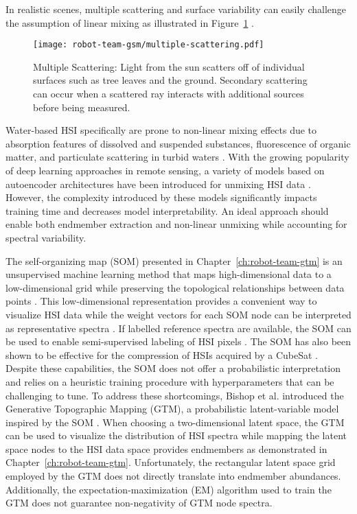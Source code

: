 In realistic scenes, multiple scattering and surface variability can easily
challenge the assumption of linear mixing as illustrated in
Figure~\ref{fig:multiple-scattering} \cite{heylen2014review}.
\begin{figure}[H]
  \centering
  \texttt{[image: robot-team-gsm/multiple-scattering.pdf]}
  \caption{Multiple Scattering: Light from the sun scatters off of individual
    surfaces such as tree leaves and the ground. Secondary
    scattering can occur when a scattered ray interacts with additional sources
    before being measured.}
  \label{fig:multiple-scattering}
\end{figure}
Water-based HSI specifically are prone to non-linear mixing effects due to absorption
features of dissolved and suspended substances, fluorescence of organic matter,
and particulate scattering in turbid waters \cite{hsi-absorption,
  hsi-fluorescence, hsi-turibidity}. With the growing popularity of deep
learning approaches in remote sensing, a variety of models based on autoencoder
architectures have been introduced for unmixing HSI data
\cite{non-negative-autoencoders,su2019daen,borsoi2019deep,palsson2020convolutional}.
However, the complexity introduced by these models significantly impacts
training time and decreases model interpretability. An ideal approach
should enable both endmember extraction and non-linear unmixing while accounting
for spectral variability.

The self-organizing map (SOM) presented in Chapter~\ref{ch:robot-team-gtm} is an
unsupervised machine learning method that
maps high-dimensional data to a low-dimensional grid while preserving the
topological relationships between data points \cite{kohonen-som-1}. This
low-dimensional representation provides a convenient way to visualize HSI data
while the weight vectors for each SOM node can be interpreted as representative
spectra \cite{cantero2004analysis, duran2007time,som-hsi}. If labelled reference
spectra are available, the SOM can be used to enable semi-supervised labeling of
HSI pixels \cite{riese2019supervised}. The SOM has also been shown to be
effective for the compression of HSIs acquired by a CubeSat
\cite{som-satellite}. Despite these capabilities, the SOM does not offer a
probabilistic interpretation and relies on a heuristic training procedure with
hyperparameters that can be challenging to tune. To address these shortcomings,
Bishop et al. introduced the Generative Topographic Mapping (GTM), a
probabilistic latent-variable model inspired by the SOM \cite{gtm-orig}. When
choosing a two-dimensional latent space, the GTM can be used to visualize the
distribution of HSI spectra while mapping the latent space nodes to the HSI data
space provides endmembers as demonstrated in Chapter~\ref{ch:robot-team-gtm}.
Unfortunately, the rectangular latent space grid employed by the GTM does not
directly translate into endmember
abundances. Additionally, the expectation-maximization (EM) algorithm used to
train the GTM does not guarantee non-negativity of GTM node spectra.

